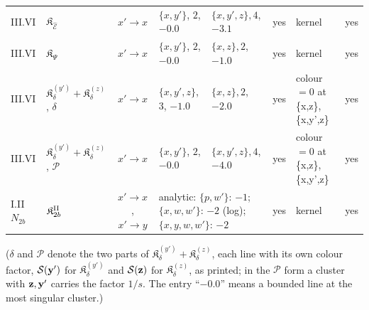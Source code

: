 {\begin{center}
\begin{tabular}{|l|l|c|l|l|c|l|c|}
III.VI & $\mathfrak K_{\widehat{\mathcal E}}$ & $x'\to x$ & $\{x,y'\}$, $2$, $-0.0$ & $\{x,y',z\}, 4$, $-3.1$ & yes & kernel & yes\\
III.VI & $\mathfrak K_\Psi$ & $x'\to x$ & $\{x,y'\}$, $2$, $-0.0$ & $\{x,z\}, 2$, $-1.0$ & yes & kernel & yes\\
III.VI & $\mathfrak K_\delta^{(y')}{+}\mathfrak K_\delta^{(z)}$, $\delta$ & $x'\to x$ & $\{x,y',z\}$, $3$, $-1.0$ & $\{x,z\}, 2$, $-2.0$ & yes & colour $=0$ at \{x,z\}, \{x,y',z\} & yes\\
III.VI & $\mathfrak K_\delta^{(y')}{+}\mathfrak K_\delta^{(z)}$, $\mathcal P$ & $x'\to x$ & $\{x,y'\}$, $2$, $-0.0$ & $\{x,y',z\}, 4$, $-4.0$ & yes & colour $=0$ at \{x,z\}, \{x,y',z\} & yes\\
I.II $N_{2b}$ & $\mathfrak K^{\rm II}_{2b}$ & $x'\to x$, $x'\to y$ & \multicolumn{2}{l|}{analytic: $\{p,w'\}$: $-1$; $\{x,w,w'\}$: $-2$ (log); $\{x,y,w,w'\}$: $-2$} & yes & kernel & yes\\\hline
\end{tabular}
\end{center}}
\noindent($\delta$ and $\mathcal P$ denote the two parts of $\mathfrak K^{(y')}_\delta+\mathfrak K^{(z)}_\delta$, each line with its own colour factor, $\mathcal S(\mathbf{y}')$ for $\mathfrak K^{(y')}_\delta$ and $\mathcal S(\mathbf{z})$ for $\mathfrak K^{(z)}_\delta$, as printed; in the $\mathcal P$ form a cluster with $\mathbf{z},\mathbf{y}'$ carries the factor $1/s$. The entry ``$-0.0$'' means a bounded line at the most singular cluster.)

